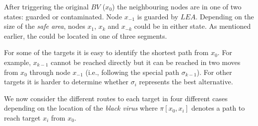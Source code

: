 After triggering the original $BV$ ($x_{0}$) the neighbouring nodes are in one of two states: guarded or contaminated.
Node $x_{-1}$ is guarded by $LEA$. Depending on the size of the {\it safe area}, nodes $x_{1}$, $x_{k}$ and $x_{-k}$ could be in either state.
As mentioned earlier, the \bv could be located in one of three segments.
\begin{comment}
\\ Here we have two scenarios: when $\left\vert{S_{area}}\right\vert \ge k$ and when $\left\vert{S_{area}}\right\vert< k$.

When $\left\vert{S_{area}}\right\vert \ge k$, $LEA$ has to deploy agents to the neighbours of the new two black viruses $\cal BV$=$\{x_1,x_k\}$  in order to clear them while $x_{-1}$ and $x_{-k}$ are already guarded by $LEA$ and $SH$.


Node  $x_{1}$ has two unoccupied neighbours N$_{un}$($x_{1}$)=\{$x_{2}$,$x_{k+1}$\} while $x_{1-k}$ is guarded by $SH$ that has moved from its previous location $x_{-k}$. Node $x_{k}$ has three unoccupied neighbours N$_{un}$($x_{k}$)=\{$x_{k-1}$,$x_{k+1}$,$x_{2k}$\}.  
Node $x_{k+1}$ is a common neighbour of $x_1$ and $x_k$.
Thus, we have that ${\cal T} = \{x_{2},x_{k-1},x_{k+1},x_{2k}\}$.
\end{comment}

 For some of the targets it is easy to identify the shortest path from $x_0$. For example,   $x_{k-1}$  cannot be reached directly but  it can  be reached in two moves from $x_0$  through node $x_{-1}$ (i.e.,  following the special path $\sigma_{k-1}$). For other targets  it is harder to determine whether $\sigma_i$ represents the best alternative.

%
We now  consider the different routes to each target in  four different  cases depending on the location of the {\it black virus} where $\pi[x_0,x_{i}] $ denotes a path to reach target $x_i$ from $x_0$. 


